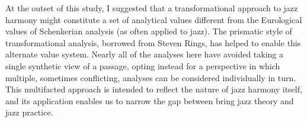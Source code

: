 At the outset of this study, I suggested that a transformational approach to
jazz harmony might constitute a set of analytical values different from the
Eurological values of Schenkerian analysis (as often applied to jazz). The
prismatic style of transformational analysis, borrowed from Steven Rings, has
helped to enable this alternate value system. Nearly all of the analyses here
have avoided taking a single synthetic view of a passage, opting instead for a
perspective in which multiple, sometimes conflicting, analyses can be
considered individually in turn. This multifacted approach is intended to
reflect the nature of jazz harmony itself, and its application enables us to
narrow the gap between bring jazz theory and jazz practice.


